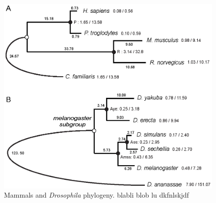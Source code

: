 \begin{figure}[htpb] 
\centering 
\includegraphics[width=\textwidth]{Part_I/Chapter_1/pictures/phylogenies.png}
\caption[Mammals and \textit{Drosophila} phylogeny]{Mammals and
  \textit{Drosophila} phylogeny. blabli blob lu dkfnlskjdf}
\label{fig:phylogeny}
\end{figure}




